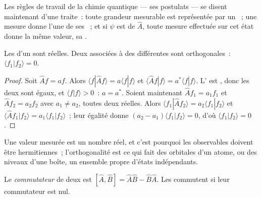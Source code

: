 Les règles de travail de la chimie quantique --- ses postulats --- se
disent maintenant d'une traite~: toute grandeur mesurable est représentée
par un ~; une mesure donne l'une de ses ~; et si $\psi$ est  de $\hat A$, toute mesure
effectuée sur cet état donne la même valeur, sa .

\begin{theorem}\label{thm:b3:quantum-model-systems:hermitian-real}
Les  d'un  sont réelles. Deux  associées à des  différentes sont orthogonales~:
$\langle f_1|f_2\rangle = 0$.
\end{theorem}

\begin{proof}
Soit $\hat Af = af$. Alors $\langle f|\hat Af\rangle = a\langle f|f\rangle$ et
$\langle\hat Af|f\rangle = a^*\langle f|f\rangle$. L' est
, donc les deux sont égaux, et $\langle f|f\rangle > 0$~: $a = a^*$.
Soient maintenant $\hat Af_1
= a_1f_1$ et $\hat Af_2 = a_2f_2$ avec $a_1 \ne a_2$, toutes deux réelles. Alors
$\langle f_1|\hat Af_2\rangle = a_2\langle f_1|f_2\rangle$ et $\langle\hat Af_1|
f_2\rangle = a_1\langle f_1|f_2\rangle$~; leur égalité donne $(a_2 - a_1)
\langle f_1|f_2\rangle = 0$, d'où $\langle f_1|f_2\rangle = 0$.
\end{proof}

Une valeur mesurée est un nombre réel, et c'est pourquoi les observables
doivent être hermitiennes~; l'orthogonalité est ce qui fait des orbitales
d'un atome, ou des niveaux d'une boîte, un ensemble propre d'états
indépendants.

\begin{definition}[Commutateur]\label{def:b3:quantum-model-systems:commutator}
Le \emph{commutateur} de deux  est $[\hat A,\hat B] =
\hat A\hat B - \hat B\hat A$. Les  commutent si leur commutateur
est nul.
\end{definition}

